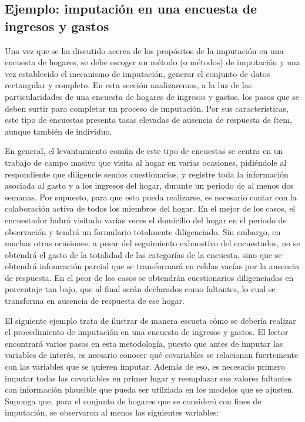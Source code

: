 \documentclass[12pt,spanish,]{book}
\begin{document}
\hypertarget{ejemplo-imputacion-en-una-encuesta-de-ingresos-y-gastos}{%
\subsection{Ejemplo: imputación en una encuesta de ingresos y gastos}\label{ejemplo-imputacion-en-una-encuesta-de-ingresos-y-gastos}}

Una vez que se ha discutido acerca de los propósitos de la imputación en una encuesta de hogares, se debe escoger un método (o métodos) de imputación y una vez establecido el mecanismo de imputación, generar el conjunto de datos rectangular y completo. En esta sección analizaremos, a la luz de las particularidades de una encuesta de hogares de ingresos y gastos, los pasos que se deben surtir para completar un proceso de imputación. Por sus características, este tipo de encuestas presenta tasas elevadas de ausencia de respuesta de ítem, aunque también de individuo.

En general, el levantamiento común de este tipo de encuestas se centra en un trabajo de campo masivo que visita al hogar en varias ocasiones, pidiéndole al respondiente que diligencie sendos cuestionarios, y registre toda la información asociada al gasto y a los ingresos del hogar, durante un periodo de al menos dos semanas. Por supuesto, para que esto pueda realizarse, es necesario contar con la colaboración activa de todos los miembros del hogar. En el mejor de los casos, el encuestador habrá visitado varias veces el domicilio del hogar en el periodo de observación y tendrá un formulario totalmente diligenciado. Sin embargo, en muchas otras ocasiones, a pesar del seguimiento exhaustivo del encuestados, no se obtendrá el gasto de la totalidad de las categorías de la encuesta, sino que se obtendrá infomración parcial que se transformará en celdas vacías por la ausencia de respuesta. En el peor de los casos se obtendrán cuestionarios diligenciados en porcentaje tan bajo, que al final serán declarados como faltantes, lo cual se transforma en ausencia de respuesta de ese hogar.

El siguiente ejemplo trata de ilustrar de manera escueta cómo se debería realizar el procedimiento de imputación en una encuesta de ingresos y gastos. El lector encontrará varios pasos en esta metodología, puesto que antes de imputar las variables de interés, es ncesario conocer qué covariables se relacionan fuertemente con las variables que se quieren imputar. Además de eso, es necesario primero imputar todas las covariables en primer lugar y reemplazar sus valores faltantes con información plausible que pueda ser utilziada en los modelos que se ajusten. Suponga que, para el conjunto de hogares que se consideró con fines de imputación, se observaron al menos las siguientes variables:
\end{document}
